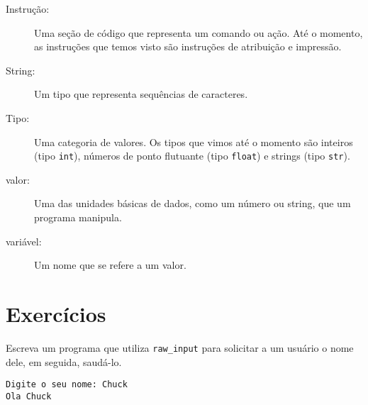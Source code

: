 \begin{description}
\item[Instrução:] Uma seção de código que representa um comando ou ação. Até 
o momento, as instruções que temos visto são instruções de atribuição e impressão.

\item[String:] Um tipo que representa sequências de caracteres.

\item[Tipo:] Uma categoria de valores. Os tipos que vimos até o momento 
são inteiros (tipo {\tt int}), números de ponto flutuante (tipo {\tt float}) 
e strings (tipo {\tt str}).

\item[valor:] Uma das unidades básicas de dados, como um número ou string,
que um programa manipula.

\item[variável:] Um nome que se refere a um valor.

\end{description}

\section{Exercícios}

\begin{ex}
Escreva um programa que utiliza \verb"raw_input" para solicitar a um usuário o nome dele,
em seguida, saudá-lo.

\begin{verbatim}
Digite o seu nome: Chuck
Ola Chuck
\end{verbatim}

\end{ex}

